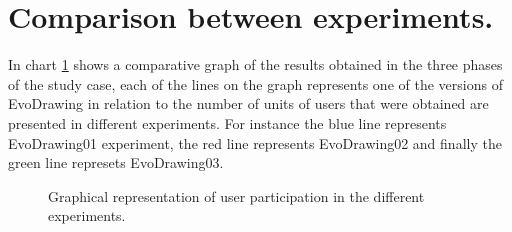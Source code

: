 \section{Comparison between experiments.}
In chart \ref{fig:comparison} shows a comparative graph of the results obtained
in the three phases of the study case, each of the lines on the graph represents
one of the versions of EvoDrawing in relation to the number of units of users
that were obtained are presented in different experiments. For instance the blue
line represents EvoDrawing01 experiment, the red line represents EvoDrawing02
and finally the green line represets EvoDrawing03.

\begin{figure}
\centering
{} %
\caption{Graphical representation of user participation in the different experiments.}
\label{fig:comparison}
\end{figure}
